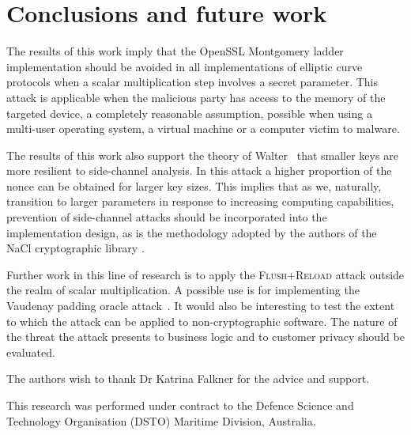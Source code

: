 \documentclass[twocolumn]{svjour3}
\newcommand{\starpar}[1]{\par{\footnotesize $\star$ \hl{#1}\par}}
\newcommand{\fl}{\textsc{Flu\-sh+\allowbreak Re\-load}\xspace}
\begin{document}
\section{Conclusions and future work}
The results of this work imply that the OpenSSL Montgomery ladder implementation should be avoided in 
all implementations of elliptic curve protocols when a scalar multiplication step involves a secret parameter. 
This attack is applicable when the malicious party has access to the memory of the targeted device, 
a completely reasonable assumption, possible when using a multi-user operating system, a virtual machine or a computer victim to malware. 

The results of this work also support the theory of Walter~\cite{walter04longer} that smaller keys are more resilient to side-channel analysis.
In this attack a higher proportion of the nonce can be obtained for larger key sizes. 
This implies that as we, naturally, transition to larger parameters in response to increasing computing capabilities, 
prevention of side-channel attacks should be incorporated into the implementation design, 
as is the methodology adopted by the authors of the NaCl cryptographic library \cite{dan-tan-peter}. 

Further work in this line of research is to apply the \fl attack outside the realm of scalar multiplication.
A possible use is for implementing the Vaudenay padding oracle attack~\cite{alfardan12plaintext,vaudenay02security}.
It would also be interesting to test the extent to which the attack can be applied to non-cryptographic software.
The nature of the threat the attack presents to business logic and to customer privacy should be evaluated.





\begin{acknowledgements}
The authors wish to thank Dr Katrina Falkner for the advice and support.

This research was  performed under contract to the Defence
Science and Technology Organisation (DSTO) Maritime Division,
Australia.
\end{acknowledgements}




\end{document}
